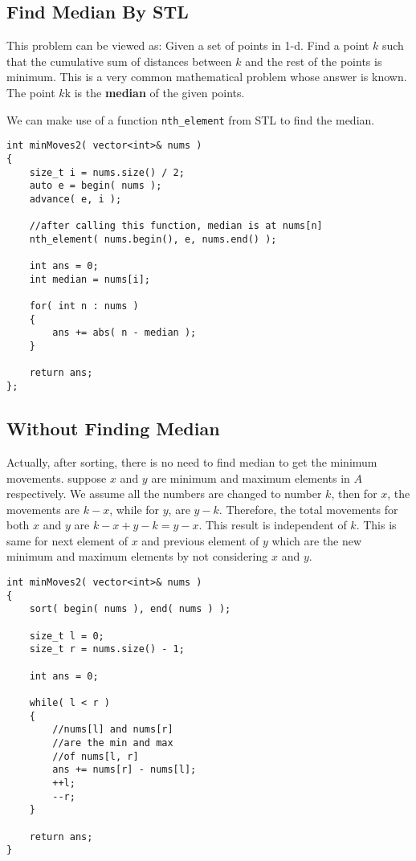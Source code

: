 \subsection{Find Median By STL}
This problem can be viewed as: Given a set of points in 1-d. Find a point $k$ such that the cumulative sum of distances between $k$ and the rest of the points is minimum. This is a very common mathematical problem whose answer is known. The point $k$k is the \textbf{median} of the given points.

We can make use of a function \lstinline[language=C++, basicstyle=\small\ttfamily, keywordstyle=\bfseries\color{green!40!black}]|nth_element| from STL to find the median.

\begin{lstlisting}[style=customc, caption={Find Median By STL}]
int minMoves2( vector<int>& nums )
{
    size_t i = nums.size() / 2;
    auto e = begin( nums );
    advance( e, i );

    //after calling this function, median is at nums[n]
    nth_element( nums.begin(), e, nums.end() );

    int ans = 0;
    int median = nums[i];

    for( int n : nums )
    {
        ans += abs( n - median );
    }

    return ans;
};
\end{lstlisting}

\subsection{Without Finding Median}
Actually, after sorting, there is no need to find median to get the minimum movements. suppose $x$ and $y$ are minimum and maximum elements in $A$ respectively. We assume all the numbers are changed to number $k$, then for $x$, the movements are $k-x$, while for $y$, are $y-k$. Therefore, the total movements for both $x$ and $y$ are $k-x+y-k= y-x$. This result is independent of $k$. This is same for next element of $x$ and previous element of $y$ which are the new minimum and maximum elements by not considering $x$ and $y$.

\begin{lstlisting}[style=customc, caption={Without Finding Median}]
int minMoves2( vector<int>& nums )
{
    sort( begin( nums ), end( nums ) );

    size_t l = 0;
    size_t r = nums.size() - 1;

    int ans = 0;

    while( l < r )
    {
        //nums[l] and nums[r]
        //are the min and max
        //of nums[l, r]
        ans += nums[r] - nums[l];
        ++l;
        --r;
    }

    return ans;
}
\end{lstlisting}

